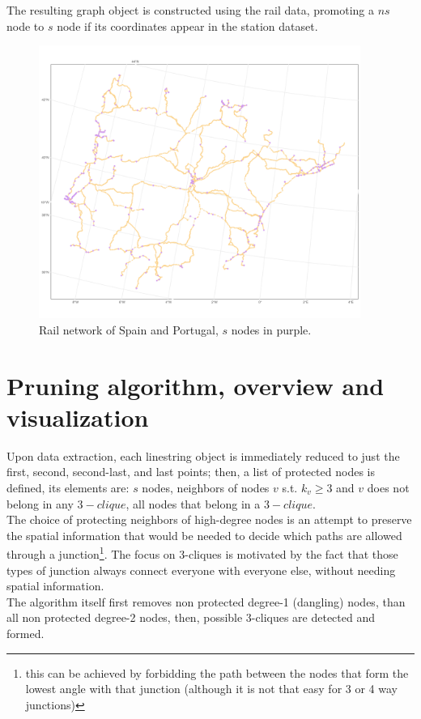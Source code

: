 The resulting graph object is constructed using the rail data, promoting a $ns$ node to $s$ node if its coordinates appear in the station dataset.
\begin{figure}[htbp]
  \centering
  \includegraphics[width=10.5cm,keepaspectratio]{images/Spain_and_Portugal.png}
  \caption{Rail network of Spain and Portugal, $s$ nodes in purple.}

\end{figure}

\section{Pruning algorithm, overview and visualization}
Upon data extraction, each linestring object is immediately reduced to just the first, second, second-last, and last points; then, a list of protected nodes is defined, its elements are: $s$ nodes, neighbors of nodes $v$ s.t. $k_v \geq 3$ and $v$ does not belong in any $3-clique$, all nodes that belong in a $3-clique$.\\
The choice of protecting neighbors of high-degree nodes is an attempt to preserve the spatial information that would be needed to decide which paths are allowed through a junction\footnote{this can be achieved by forbidding the path between the nodes that form the lowest angle with that junction (although it is not that easy for 3 or 4 way junctions)}. The focus on 3-cliques is motivated by the fact that those types of junction always connect everyone with everyone else, without needing spatial information.\\
The algorithm itself first removes non protected degree-1 (dangling) nodes, than all non protected degree-2 nodes, then, possible 3-cliques are detected and formed. \\

